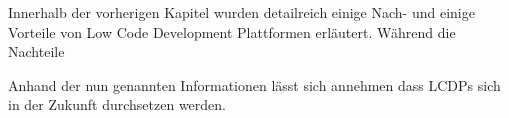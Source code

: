 \documentclass[12pt]{article} %
\begin{document}
	Innerhalb der vorherigen Kapitel wurden detailreich einige Nach- und einige Vorteile von Low Code Development Plattformen erläutert. Während die Nachteile 
	
	
	Anhand der nun genannten Informationen lässt sich annehmen dass LCDPs sich in der Zukunft durchsetzen werden. 
	
	\newpage	
	\printbibliography %
\end{document}
